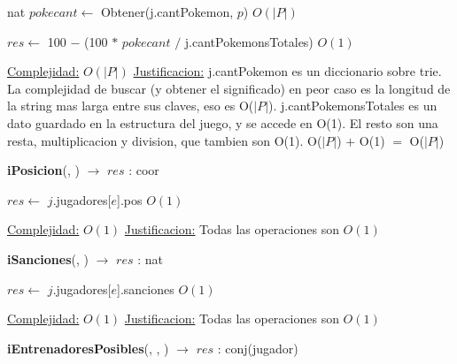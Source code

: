 \begin{Algoritmos}
\begin{algorithm}[H]
\begin{algorithmic}[1]
\State nat $pokecant \gets$ Obtener(j.cantPokemon, $p$) \Comment $O(|P|)$

\State $res \gets$ 100 $-$ (100 $*$ $pokecant$ $/$ j.cantPokemonsTotales) \Comment $O(1)$

\medskip
\State \underline{Complejidad:} $O(|P|)$
\State \underline{Justificacion:} j.cantPokemon es un diccionario sobre trie. La complejidad de buscar (y obtener el significado) en peor caso es la longitud de la string mas larga entre sus claves, eso es O($|P|$). j.cantPokemonsTotales es un dato guardado en la estructura del juego, y se accede en O(1). El resto son una resta, multiplicacion y division, que tambien son O(1). O($|P|$) $+$ O(1) $=$ O($|P|$)

\end{algorithmic}
\end{algorithm}


\begin{algorithm}[H]
{\textbf{iPosicion}(, ) $\to$ $res$ : coor}
\begin{algorithmic}[1]

\State $res \gets$ $j$.jugadores[$e$].pos \Comment $O(1)$

\medskip
\State \underline{Complejidad:} $O(1)$
\State \underline{Justificacion:} Todas las operaciones son $O(1)$


\end{algorithmic}
\end{algorithm}



\begin{algorithm}[H]
{\textbf{iSanciones}(, ) $\to$ $res$ : nat}
\begin{algorithmic}[1]

\State $res \gets$ $j$.jugadores[$e$].sanciones \Comment $O(1)$

\medskip
\State \underline{Complejidad:} $O(1)$
\State \underline{Justificacion:} Todas las operaciones son $O(1)$


\end{algorithmic}
\end{algorithm}


\begin{algorithm}[H]
{\textbf{iEntrenadoresPosibles}(, , ) $\to$ $res$ : conj(jugador)}
\begin{algorithmic}[1]


\end{algorithmic}
\end{algorithm}
\end{Algoritmos}
